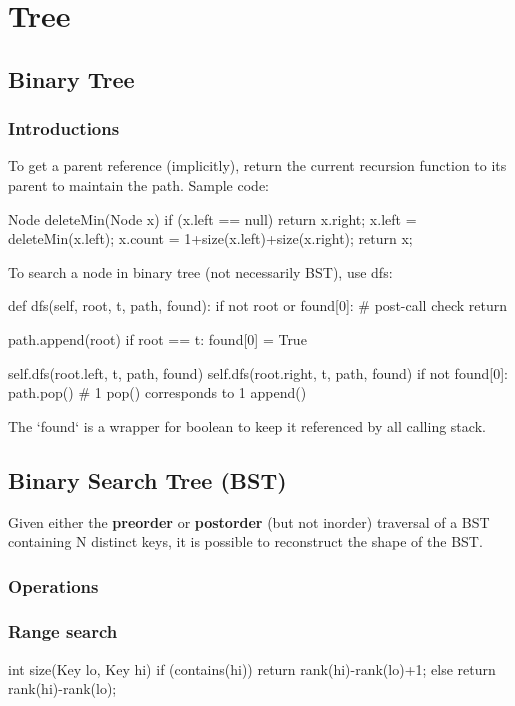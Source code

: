 \chapter{Tree}

\section{Binary Tree}
\subsection{Introductions}
 To get a parent reference (implicitly), return the current recursion function to its parent to maintain the path. Sample code:
\begin{java}
Node deleteMin(Node x) {
    if (x.left == null) return x.right;
    x.left = deleteMin(x.left);
    x.count = 1+size(x.left)+size(x.right);
    return x;
}
\end{java}
 To search a node in binary tree (not necessarily BST), use dfs:
\begin{python}
def dfs(self, root, t, path, found):
    if not root or found[0]:  # post-call check
        return

    path.append(root)
    if root == t:
        found[0] = True

    self.dfs(root.left, t, path, found)
    self.dfs(root.right, t, path, found)
    if not found[0]:
        path.pop()  # 1 pop() corresponds to 1 append()
\end{python}
The `found` is a wrapper for boolean to keep it referenced by all calling stack. 
\section{Binary Search Tree (BST)}
Given either the \textbf{preorder} or \textbf{postorder} (but not inorder) traversal of a BST containing N distinct keys, it is possible to reconstruct the shape of the BST. 
\subsection{Operations}

\subsection{Range search}
\begin{java}
int size(Key lo, Key hi) {
    if (contains(hi)) return rank(hi)-rank(lo)+1;
    else              return rank(hi)-rank(lo);
}
\end{java}
